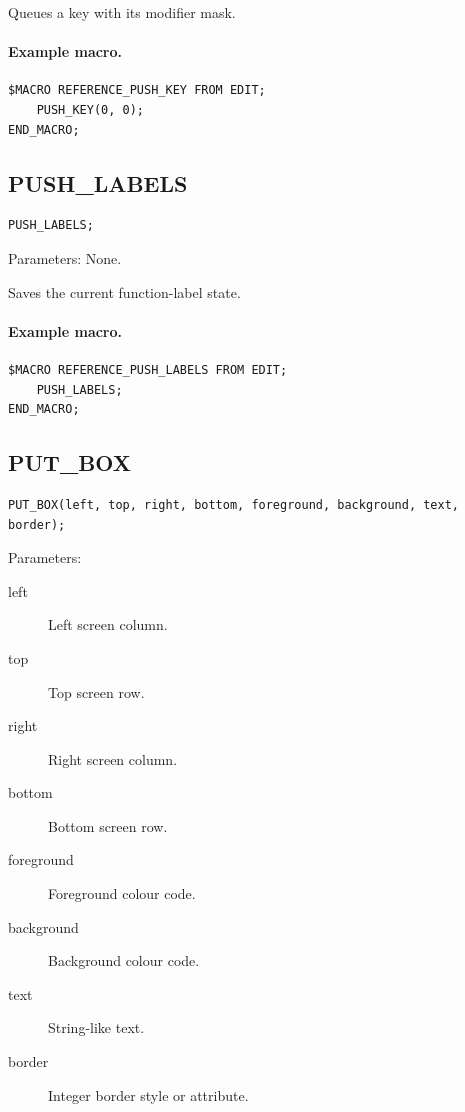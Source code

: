 \documentclass[a4paper,10pt,twoside,openany]{book}
\begin{document}
Queues a key with its modifier mask.

\paragraph{Example macro.}
\begin{verbatim}
$MACRO REFERENCE_PUSH_KEY FROM EDIT;
    PUSH_KEY(0, 0);
END_MACRO;
\end{verbatim}

\label{prim:procedure-push-labels}
\subsection*{PUSH\_LABELS}
\begin{verbatim}
PUSH_LABELS;
\end{verbatim}
Parameters: None.

Saves the current function-label state.

\paragraph{Example macro.}
\begin{verbatim}
$MACRO REFERENCE_PUSH_LABELS FROM EDIT;
    PUSH_LABELS;
END_MACRO;
\end{verbatim}

\label{prim:procedure-put-box}
\subsection*{PUT\_BOX}
\begin{verbatim}
PUT_BOX(left, top, right, bottom, foreground, background, text, border);
\end{verbatim}
Parameters:
\begin{description}
\item[left] Left screen column.
\item[top] Top screen row.
\item[right] Right screen column.
\item[bottom] Bottom screen row.
\item[foreground] Foreground colour code.
\item[background] Background colour code.
\item[text] String-like text.
\item[border] Integer border style or attribute.
\end{description}
\end{document}
